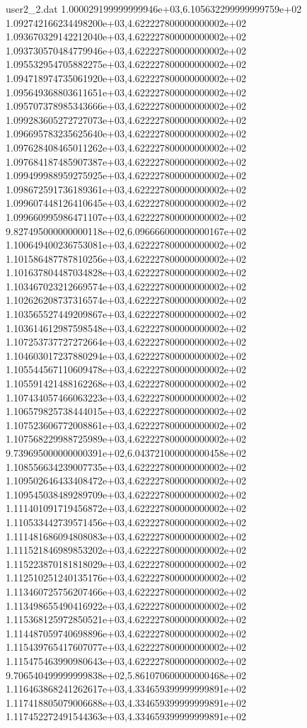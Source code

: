\begin{filecontents}{user2_2.dat}
1.000029199999999946e+03,6.105632299999999759e+02
1.092742166234498200e+03,4.622227800000000002e+02
1.093670329142212040e+03,4.622227800000000002e+02
1.093730570484779946e+03,4.622227800000000002e+02
1.095532954705882275e+03,4.622227800000000002e+02
1.094718974735061920e+03,4.622227800000000002e+02
1.095649368803611651e+03,4.622227800000000002e+02
1.095707378985343666e+03,4.622227800000000002e+02
1.099283605272727073e+03,4.622227800000000002e+02
1.096695783235625640e+03,4.622227800000000002e+02
1.097628408465011262e+03,4.622227800000000002e+02
1.097684187485907387e+03,4.622227800000000002e+02
1.099499988959275925e+03,4.622227800000000002e+02
1.098672591736189361e+03,4.622227800000000002e+02
1.099607448126410645e+03,4.622227800000000002e+02
1.099660995986471107e+03,4.622227800000000002e+02
9.827495000000000118e+02,6.096666000000000167e+02
1.100649400236753081e+03,4.622227800000000002e+02
1.101586487787810256e+03,4.622227800000000002e+02
1.101637804487034828e+03,4.622227800000000002e+02
1.103467023212669574e+03,4.622227800000000002e+02
1.102626208737316574e+03,4.622227800000000002e+02
1.103565527449209867e+03,4.622227800000000002e+02
1.103614612987598548e+03,4.622227800000000002e+02
1.107253737727272664e+03,4.622227800000000002e+02
1.104603017237880294e+03,4.622227800000000002e+02
1.105544567110609478e+03,4.622227800000000002e+02
1.105591421488162268e+03,4.622227800000000002e+02
1.107434057466063223e+03,4.622227800000000002e+02
1.106579825738444015e+03,4.622227800000000002e+02
1.107523606772008861e+03,4.622227800000000002e+02
1.107568229988725989e+03,4.622227800000000002e+02
9.739695000000000391e+02,6.043721000000000458e+02
1.108556634239007735e+03,4.622227800000000002e+02
1.109502646433408472e+03,4.622227800000000002e+02
1.109545038489289709e+03,4.622227800000000002e+02
1.111401091719456872e+03,4.622227800000000002e+02
1.110533442739571456e+03,4.622227800000000002e+02
1.111481686094808083e+03,4.622227800000000002e+02
1.111521846989853202e+03,4.622227800000000002e+02
1.115223870181818029e+03,4.622227800000000002e+02
1.112510251240135176e+03,4.622227800000000002e+02
1.113460725756207466e+03,4.622227800000000002e+02
1.113498655490416922e+03,4.622227800000000002e+02
1.115368125972850521e+03,4.622227800000000002e+02
1.114487059740698896e+03,4.622227800000000002e+02
1.115439765417607077e+03,4.622227800000000002e+02
1.115475463990980643e+03,4.622227800000000002e+02
9.706540499999999838e+02,5.861070600000000468e+02
1.116463868241262617e+03,4.334659399999999891e+02
1.117418805079006688e+03,4.334659399999999891e+02
1.117452272491544363e+03,4.334659399999999891e+02

\end{filecontents}
